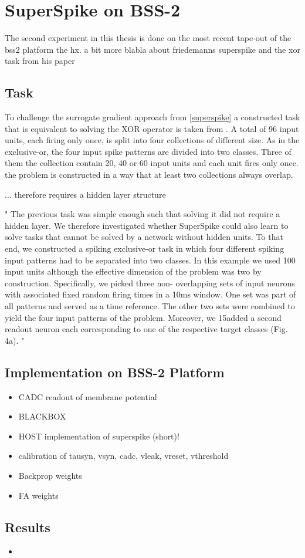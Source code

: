 \section{SuperSpike on BSS-2}

The second experiment in this thesis is done on the most recent tape-out of the \gls{bss2} platform the \gls{hx}. 
a bit more blabla about friedemanns superspike and the xor task from his paper 
 
\subsection{Task}
To challenge the surrogate gradient approach from \cref{superspike} a constructed task that is equivalent to solving the XOR operator is taken from \cite{zenke2018superspike}.
A total of 96 input units, each firing only once, is split into four collections of different size. As in the exclusive-or, the four input spike patterns are divided into two classes. Three of them the collection contain 20, 40 or 60 input units and each unit fires only once. the problem is constructed in a way that at least two collections always overlap.

... therefore requires a hidden layer structure


"
The previous task was simple enough such that solving it did not require a hidden
layer. We therefore investigated whether SuperSpike could also learn to solve tasks
that cannot be solved by a network without hidden units. To that end, we constructed
a spiking exclusive-or task in which four different spiking input patterns had to be
separated into two classes. In this example we used 100 input units although the effective
dimension of the problem was two by construction. Specifically, we picked three non-
overlapping sets of input neurons with associated fixed random firing times in a 10ms
window. One set was part of all patterns and served as a time reference. The other
two sets were combined to yield the four input patterns of the problem. Moreover, we
15added a second readout neuron each corresponding to one of the respective target classes
(Fig. 4a).
"


\subsection{Implementation on BSS-2 Platform}
\begin{itemize}
	\item CADC readout of membrane potential
	\item BLACKBOX
	\item HOST implementation of superspike (short)!
	\item calibration of tausyn, vsyn, cadc, vleak, vreset, vthreshold
	\item Backprop weights
	\item FA weights
\end{itemize}
	
\subsection{Results}
\begin{itemize}
	\item 
\end{itemize}
